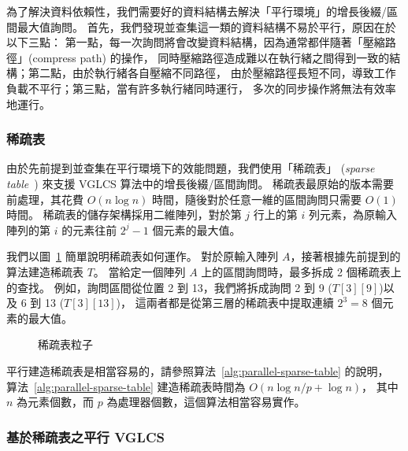 為了解決資料依賴性，我們需要好的資料結構去解決「平行環境」的增長後綴/區間最大值詢問。
首先，我們發現並查集這一類的資料結構不易於平行，原因在於以下三點：
第一點，每一次詢問將會改變資料結構，因為通常都伴隨著「壓縮路徑」(compress path) 的操作，
同時壓縮路徑造成難以在執行緒之間得到一致的結構；第二點，由於執行緒各自壓縮不同路徑，
由於壓縮路徑長短不同，導致工作負載不平行；第三點，當有許多執行緒同時運行，
多次的同步操作將無法有效率地運行。

\subsubsection{稀疏表} \label{sec:sparse-table}

由於先前提到並查集在平行環境下的效能問題，我們使用「稀疏表」
({\em sparse table}~\cite{Berkman1993RecursiveSP}) 來支援 VGLCS 算法中的增長後綴/區間詢問。
稀疏表最原始的版本需要前處理，其花費 $O(n \log n)$ 時間，隨後對於任意一維的區間詢問只需要 $O(1)$ 時間。
稀疏表的儲存架構採用二維陣列，對於第 $j$ 行上的第 $i$ 列元素，為原輸入陣列的第 $i$ 的元素往前 $2^j-1$ 個元素的最大值。

我們以圖~\ref{fig:interval-decomposition} 簡單說明稀疏表如何運作。
對於原輸入陣列 $A$，接著根據先前提到的算法建造稀疏表 $T$。
當給定一個陣列 $A$ 上的區間詢問時，最多拆成 2 個稀疏表上的查找。
例如，詢問區間從位置 2 到 13，我們將拆成詢問 2 到 9 ($T[3][9]$)以及 6 到 13 ($T[3][13]$)，
這兩者都是從第三層的稀疏表中提取連續 $2^3 = 8$ 個元素的最大值。


\begin{figure}[!thb]
  \centering {} 
  \caption{稀疏表粒子}
  \label{fig:interval-decomposition}
\end{figure}

平行建造稀疏表是相當容易的，請參照算法~\ref{alg:parallel-sparse-table} 的說明，
算法~\ref{alg:parallel-sparse-table} 建造稀疏表時間為 $O(n \log n / p + \log n)$，
其中 $n$ 為元素個數，而 $p$ 為處理器個數，這個算法相當容易實作。




\subsubsection{基於稀疏表之平行 VGLCS}

